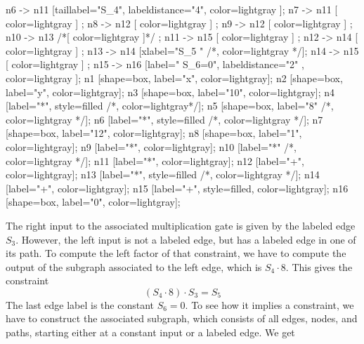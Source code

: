 \begin{example}
\begin{center}
{	n6 -> n11 [taillabel="S_4", labeldistance="4", color=lightgray ];
	n7 -> n11 [ color=lightgray ] ;
	n8 -> n12 [ color=lightgray ] ;
	n9 -> n12 [ color=lightgray ] ;
	n10 -> n13 /*[ color=lightgray ]*/ ; 
	n11 -> n15 [ color=lightgray ] ;
	n12 -> n14 [ color=lightgray ] ;	
	n13 -> n14 [xlabel="S_5  "  /*, color=lightgray */];
	n14 -> n15 [ color=lightgray ] ;
	n15 -> n16 [label="  S_6=0", labeldistance="2" , color=lightgray ];
	n1 [shape=box, label="x", color=lightgray];
	n2 [shape=box, label="y", color=lightgray];
	n3 [shape=box, label="10", color=lightgray];
	n4 [label="*", style=filled /*, color=lightgray*/];
	n5 [shape=box, label="8" /*, color=lightgray */];
	n6 [label="*", style=filled /*, color=lightgray */];
	n7 [shape=box, label="12", color=lightgray];
	n8 [shape=box, label="1", color=lightgray];
	n9 [label="*", color=lightgray];
	n10 [label="*" /*, color=lightgray */];
	n11 [label="*", color=lightgray];	
	n12 [label="+", color=lightgray];	
	n13 [label="*", style=filled /*, color=lightgray */];
	n14 [label="+", color=lightgray];
	n15 [label="+", style=filled, color=lightgray];
	n16 [shape=box, label="0", color=lightgray];		
}
\end{center}
The right input to the associated multiplication gate is given by the labeled edge $S_3$. However,  the left input is not a labeled edge, but has a labeled edge in one of its path. To compute the left factor of that constraint, we have to compute the output of the subgraph associated to the left edge, which is $S_4\cdot 8$. This gives the constraint
$$
(S_4 \cdot 8) \cdot S_3 = S_5
$$ 
The last edge label is the constant $S_6=0$. To see how it implies a constraint, we have to construct the associated subgraph, which consists of all edges, nodes, and paths, starting either at a constant input or a labeled edge. We get
\begin{center}
\end{center}
\end{example}
